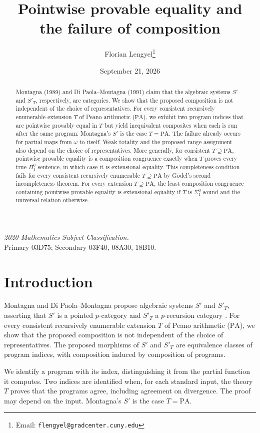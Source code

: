 \documentclass[11pt]{article}
\title{Pointwise provable equality and the failure of composition}
\author{Florian Lengyel\thanks{Email: \texttt{flengyel@gradcenter.cuny.edu}}}
\date{September 21, 2026}
\newcommand{\PA}{\mathrm{PA}}
\begin{document}
\maketitle

\begin{abstract}
Montagna (1989) and Di Paola--Montagna (1991) claim that the
algebraic systems $S'$ and $S'_T$, respectively, are categories.
We show that the proposed composition is not independent of the choice
of representatives.
For every consistent recursively enumerable
extension $T$ of Peano arithmetic ($\PA$), we exhibit two program indices that are
pointwise provably equal in $T$ but yield inequivalent composites
when each is run after the same program. Montagna's $S'$ is the
case $T=\PA$. The failure already occurs for partial maps from $\omega$
to itself.
Weak totality and the proposed range assignment also depend on the
choice of representatives.
More generally, for consistent $T\supseteq\PA$, pointwise provable equality
is a composition congruence exactly when $T$ proves every true $\Pi^0_1$
sentence, in which case it is extensional equality.
This completeness condition fails for every consistent recursively
enumerable $T\supseteq\PA$ by G\"odel's second incompleteness theorem.
For every extension $T\supseteq\PA$, the least composition congruence
containing pointwise provable equality is extensional equality if $T$
is $\Sigma^0_1$-sound and the universal relation otherwise.
\end{abstract}

\noindent\textit{2020 Mathematics Subject Classification.}\\
Primary 03D75; Secondary 03F40, 08A30, 18B10.

\section{Introduction}\label{sec:introduction}

Montagna and Di Paola--Montagna propose algebraic systems $S'$ and
$S'_T$, asserting that $S'$ is a pointed $p$-category
\cite[pp.~106, 108]{Montagna} and $S'_T$ a $p$-recursion category
\cite[p.~646]{DiPaolaMontagna}.
For every consistent recursively enumerable extension $T$ of
Peano arithmetic ($\PA$), we show that the proposed composition is not
independent of the choice of representatives.
The proposed morphisms of $S'$ and $S'_T$ are equivalence classes
of program indices, with composition induced by composition of programs.

We identify a program with its index, distinguishing it from the
partial function it computes.
Two indices are identified when, for each standard input, the theory $T$
proves that the programs agree, including agreement on divergence.
The proof may depend on the input. Montagna's $S'$ is the case $T=\PA$.
\end{document}
